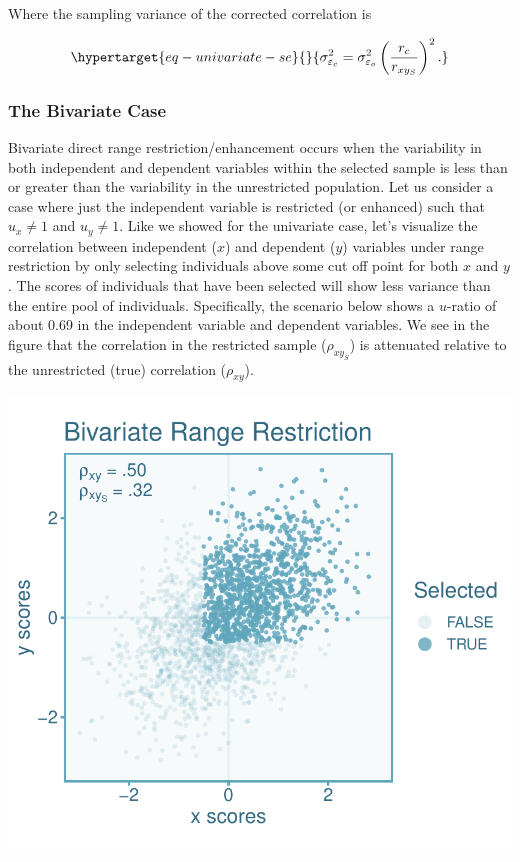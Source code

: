 \documentclass[
  letterpaper,
  DIV=11,
  numbers=noendperiod]{scrreprt}
\begin{document}
Where the sampling variance of the corrected correlation is

\begin{equation}\protect\hypertarget{eq-univariate-se}{}{
\sigma^2_{\varepsilon_c} = \sigma^2_{\varepsilon_o}\left(\frac{r_c}{r_{xy_S}}\right)^2.
}\label{eq-univariate-se}\end{equation}

\hypertarget{the-bivariate-case-1}{%
\subsubsection{The Bivariate Case}\label{the-bivariate-case-1}}

Bivariate direct range restriction/enhancement occurs when the
variability in both independent and dependent variables within the
selected sample is less than or greater than the variability in the
unrestricted population. Let us consider a case where just the
independent variable is restricted (or enhanced) such that \(u_x\neq 1\)
and \(u_y \neq 1\). Like we showed for the univariate case, let's
visualize the correlation between independent (\(x\)) and dependent
(\(y\)) variables under range restriction by only selecting individuals
above some cut off point for both \(x\) and \(y\). The scores of
individuals that have been selected will show less variance than the
entire pool of individuals. Specifically, the scenario below shows a
\(u\)-ratio of about 0.69 in the independent variable and dependent
variables. We see in the figure that the correlation in the restricted
sample (\(\rho_{xy_S}\)) is attenuated relative to the unrestricted
(true) correlation (\(\rho_{xy}\)).

\includegraphics{direct_range_restriction_files/figure-pdf/unnamed-chunk-4-1.pdf}
\end{document}
